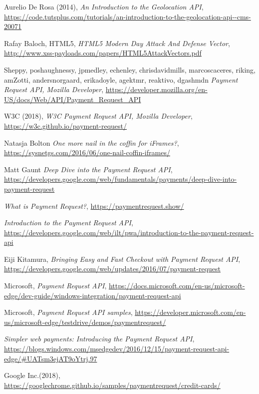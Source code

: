 \documentclass[11pt ,a4paper , twoside , openright ]{article}
\begin{document}
\begin{thebibliography}{99}
	\bibitem{}
	Aurelio De Rosa (2014),
	\emph{An Introduction to the Geolocation API},
	\url{https://code.tutsplus.com/tutorials/an-introduction-to-the-geolocation-api--cms-20071}
	
	\bibitem{}
	Rafay Baloch, HTML5,
	\emph{HTML5 Modern Day Attack And Defense Vector},
	\url{http://www.xss-payloads.com/papers/HTML5AttackVectors.pdf}
	
	
	\bibitem{}
	Sheppy, poshaughnessy, jpmedley, echenley, chrisdavidmills, marcoscaceres, riking, amZotti, andersnorgaard, erikadoyle, agektmr, reaktivo, dgashmdn
	\emph{Payment Request API, Mozilla Developer},
	\url{https://developer.mozilla.org/en-US/docs/Web/API/Payment_Request_API}
	
	\bibitem{}
	W3C (2018),
	\emph{W3C Payment Request API, Mozilla Developer},
	\url{https://w3c.github.io/payment-request/}
	
	\bibitem{}
	Natasja Bolton
	\emph{One more nail in the coffin for iFrames?}, 
	\url{https://sysnetgs.com/2016/06/one-nail-coffin-iframes/}
	
	\bibitem{}
	Matt Gaunt
	\emph{Deep Dive into the Payment Request API}, 
	\url{https://developers.google.com/web/fundamentals/payments/deep-dive-into-payment-request}
	
	\bibitem{}
	\emph{What is Payment Request?},
	\url{https://paymentrequest.show/}
	
	\bibitem{}
	\emph{Introduction to the Payment Request API},
	\url{https://developers.google.com/web/ilt/pwa/introduction-to-the-payment-request-api}
	
	\bibitem{}
	Eiji Kitamura,
	\emph{Bringing Easy and Fast Checkout with Payment Request API},
	\url{https://developers.google.com/web/updates/2016/07/payment-request}
	
	\bibitem{}
	Microsoft,
	\emph{Payment Request API},
	\url{https://docs.microsoft.com/en-us/microsoft-edge/dev-guide/windows-integration/payment-request-api}
	
	\bibitem{}
	Microsoft,
	\emph{Payment Request API samples},
	\url{https://developer.microsoft.com/en-us/microsoft-edge/testdrive/demos/paymentrequest/}
	
	\bibitem{}
	\emph{Simpler web payments: Introducing the Payment Request API},
	\url{https://blogs.windows.com/msedgedev/2016/12/15/payment-request-api-edge/#UATsm3ejAT9oYtrj.97}
	
	\bibitem{}
	Google Inc.(2018),
	\url{https://googlechrome.github.io/samples/paymentrequest/credit-cards/}
	

\end{thebibliography}
\end{document}
